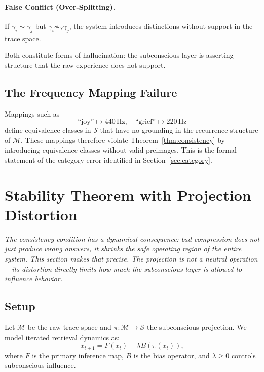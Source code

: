 \documentclass[12pt,a4paper]{article}
\begin{document}
\paragraph{False Conflict (Over-Splitting).}
If $\gamma_i \sim \gamma_j$ but $\gamma_i \not\sim_{\mathcal{S}} \gamma_j$, the system introduces distinctions without support in the trace space.

Both constitute forms of hallucination: the subconscious layer is asserting structure that the raw experience does not support.

\subsection{The Frequency Mapping Failure}

Mappings such as
\[
\text{``joy''} \mapsto 440\,\text{Hz}, \quad \text{``grief''} \mapsto 220\,\text{Hz}
\]
define equivalence classes in $\mathcal{S}$ that have no grounding in the recurrence structure of $\mathcal{M}$. These mappings therefore violate Theorem~\ref{thm:consistency} by introducing equivalence classes without valid preimages. This is the formal statement of the category error identified in Section~\ref{sec:category}.

\section{Stability Theorem with Projection Distortion}
\label{sec:stability}

\textit{The consistency condition has a dynamical consequence: bad compression does not just produce wrong answers, it shrinks the safe operating region of the entire system. This section makes that precise. The projection is not a neutral operation---its distortion directly limits how much the subconscious layer is allowed to influence behavior.}

\subsection{Setup}

Let $\mathcal{M}$ be the raw trace space and $\pi : \mathcal{M} \rightarrow \mathcal{S}$ the subconscious projection. We model iterated retrieval dynamics as:
\[
x_{t+1} = F(x_t) + \lambda B(\pi(x_t)),
\]
where $F$ is the primary inference map, $B$ is the bias operator, and $\lambda \geq 0$ controls subconscious influence.
\end{document}

